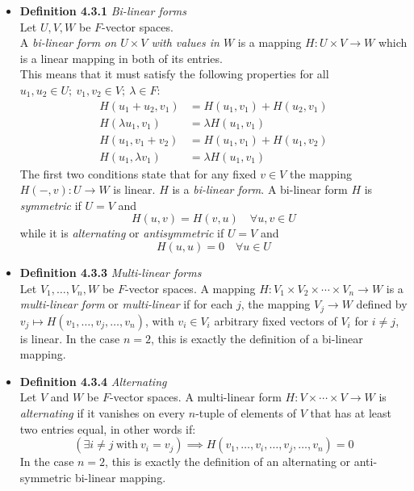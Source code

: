 \documentclass[11pt,a4paper]{article}
\begin{document}
\begin{itemize}
    \item \textbf{Definition 4.3.1} \emph{Bi-linear forms} \\
        Let $U,V, W$ be $F$-vector spaces. \\
        A \emph{bi-linear form on $U \times V$ with values in $W$} is a mapping
        $H:U \times V \to W$ which is a linear mapping in both of its entries. \\
        This means that it must satisfy the following properties for all
        $u_1, u_2 \in U; \ v_1, v_2 \in V; \ \lambda \in F$:
        \begin{align*}{}
            H(u_1 + u_2, v_1)   &= H(u_1, v_1) + H(u_2, v_1) \\
            H(\lambda u_1, v_1) &= \lambda H(u_1, v_1) \\
            H(u_1, v_1 + v_2)   &= H(u_1, v_1) + H(u_1, v_2) \\
            H(u_1, \lambda v_1) &= \lambda H(u_1, v_1)
        \end{align*}
        The first two conditions state that for any fixed $v \in V$ the mapping
        $H(-, v) : U \to W$ is linear.
        $H$ is a \emph{bi-linear form}.
        A bi-linear form $H$ is \emph{symmetric} if $U=V$ and
        \[
            H(u, v) = H(v, u) \quad \forall u, v \in U
        \]
        while it is \emph{alternating} or \emph{antisymmetric} if $U=V$ and
        \[
            H(u, u) = 0 \quad \forall u \in U
        \]

    \item \textbf{Definition 4.3.3} \emph{Multi-linear forms} \\
        Let $V_1, \ldots, V_n, W$ be $F$-vector spaces.
        A mapping $H : V_1 \times V_2 \times \cdots \times V_n \to W$
        is a \emph{multi-linear form} or \emph{multi-linear}
        if for each $j$, the mapping $V_j \to W$ defined by
        $v_j \mapsto H(v_1, \ldots, v_j, \ldots, v_n)$, with $v_i \in V_i$ arbitrary fixed vectors
        of $V_i$ for $i \neq j$, is linear.
        In the case $n=2$, this is exactly the definition of a bi-linear mapping.

    \item \textbf{Definition 4.3.4} \emph{Alternating} \\
        Let $V$ and $W$ be $F$-vector spaces.
        A multi-linear form $H : V \times \cdots \times V \to W$
        is \emph{alternating} if it vanishes on every $n$-tuple of elements of $V$ that has at
        least two entries equal, in other words if:
        \[
            (\exists i \neq j \ \mathrm{with} \ v_i = v_j) \implies
            H(v_1, \ldots, v_i, \ldots, v_j, \ldots, v_n) = 0
        \]
        In the case $n=2$, this is exactly the definition of an alternating or anti-symmetric
        bi-linear mapping.


\end{itemize}
\end{document}
